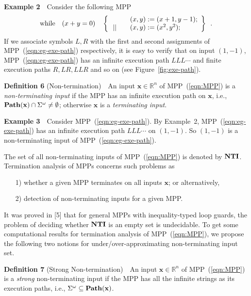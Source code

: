 \documentclass{article}
\def\dsee#1{\vskip 0.3cm \noindent{\bf #1} \vskip 0.2cm}
\newcommand{\while}{{\rm while}}
\newcommand{\xx}{\mathbf{x}}
\newcommand{\NTI}{{\bf NTI}}
\begin{document}
{\bf Example 2}~~{Consider the following MPP
\begin{equation}\label{eqn:eg-exe-path}
\while \quad (x+y=0) \quad \left\{
\begin{array}{ll}
& \quad (x,y) := (x+1, y-1); \\
\,|| & \quad (x,y) := (x^2, y^2); \\
\end{array}
\right\}
\enspace .
\end{equation}
If we associate symbols $L,R$ with the first and second assignments of MPP~(\ref{eqn:eg-exe-path}) respectively, it is easy to verify that on input $(1,-1)$, MPP~(\ref{eqn:eg-exe-path}) has an infinite execution path $LLL \cdots$ and finite execution paths $R,LR,LLR$ and so on (see Figure~\ref{fig:exe-path}). }

    \dsee{3.3~~Non-termination Definitions}
    {\bf Definition 6} (Non-termination)~~{An input $\xx \in \mathbb{R}^n$ of MPP~(\ref{eqn:MPP}) is a {\em non-terminating input} if the MPP has an infinite execution path on $\xx$, i.e., ${\bf Path}(\xx) \cap \Sigma^{\omega} \neq \emptyset$; otherwise $\xx$ is a \emph{terminating input}.}

\label{eg:nt}{\bf Example 3}~~{Consider MPP~(\ref{eqn:eg-exe-path}). By Example~2, MPP~(\ref{eqn:eg-exe-path}) has an infinite execution path $LLL \cdots$ on $(1,-1)$. So $(1,-1)$ is a non-terminating input of MPP~(\ref{eqn:eg-exe-path}). }

The set of all non-terminating inputs of MPP~(\ref{eqn:MPP}) is denoted by $\NTI$. Termination analysis of MPPs concerns such problems as
\begin{enumerate}
\item[1)] whether a given MPP terminates on all inputs $\xx$; or alternatively,
\item[2)] detection of non-terminating inputs for a given MPP.
\end{enumerate}
It was proved in [5] that for general MPPs with inequality-typed loop guards, the problem of deciding whether $\NTI$ is an empty set is undecidable. To get some computational results for termination analysis of MPP~(\ref{eqn:MPP}), we propose the following two notions for under/over-approximating non-terminating input set.

{\bf Definition 7} (Strong Non-termination)~~{An input $\xx \in \mathbb{R}^n$ of MPP~(\ref{eqn:MPP}) is a \emph{strong} non-terminating input if the MPP has all the infinite strings as its execution paths, i.e., $\Sigma^{\omega} \subseteq {\bf Path}(\xx)$.}
\end{document}

